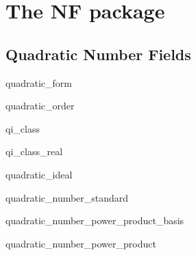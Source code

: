 %
%
%
%

\part*{The \LiDIA NF package}\label{LiDIA-NF}



\chapter{Quadratic Number Fields}

\begin{class}{quadratic_form}
  
\end{class}

\begin{class}{quadratic_order}
  
\end{class}

\begin{class}{qi_class}
  
\end{class}

\begin{class}{qi_class_real}
  
\end{class}

\begin{class}{quadratic_ideal}
  
\end{class}

\begin{class}{quadratic_number_standard}
  
\end{class}

\begin{class}{quadratic_number_power_product_basis}
  
\end{class}

\begin{class}{quadratic_number_power_product}
  
\end{class}


